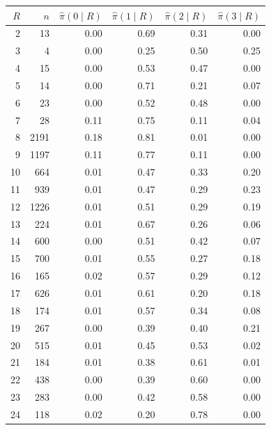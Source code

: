 \begin{tabular}{rrrrrr}
\toprule
$R$ & $n$ & $\hat\pi(0\mid R)$ & $\hat\pi(1\mid R)$ & $\hat\pi(2\mid R)$ & $\hat\pi(3\mid R)$ \\
\midrule
2 & 13 & 0.00 & 0.69 & 0.31 & 0.00 \\
3 & 4 & 0.00 & 0.25 & 0.50 & 0.25 \\
4 & 15 & 0.00 & 0.53 & 0.47 & 0.00 \\
5 & 14 & 0.00 & 0.71 & 0.21 & 0.07 \\
6 & 23 & 0.00 & 0.52 & 0.48 & 0.00 \\
7 & 28 & 0.11 & 0.75 & 0.11 & 0.04 \\
8 & 2191 & 0.18 & 0.81 & 0.01 & 0.00 \\
9 & 1197 & 0.11 & 0.77 & 0.11 & 0.00 \\
10 & 664 & 0.01 & 0.47 & 0.33 & 0.20 \\
11 & 939 & 0.01 & 0.47 & 0.29 & 0.23 \\
12 & 1226 & 0.01 & 0.51 & 0.29 & 0.19 \\
13 & 224 & 0.01 & 0.67 & 0.26 & 0.06 \\
14 & 600 & 0.00 & 0.51 & 0.42 & 0.07 \\
15 & 700 & 0.01 & 0.55 & 0.27 & 0.18 \\
16 & 165 & 0.02 & 0.57 & 0.29 & 0.12 \\
17 & 626 & 0.01 & 0.61 & 0.20 & 0.18 \\
18 & 174 & 0.01 & 0.57 & 0.34 & 0.08 \\
19 & 267 & 0.00 & 0.39 & 0.40 & 0.21 \\
20 & 515 & 0.01 & 0.45 & 0.53 & 0.02 \\
21 & 184 & 0.01 & 0.38 & 0.61 & 0.01 \\
22 & 438 & 0.00 & 0.39 & 0.60 & 0.00 \\
23 & 283 & 0.00 & 0.42 & 0.58 & 0.00 \\
24 & 118 & 0.02 & 0.20 & 0.78 & 0.00 \\
\bottomrule
\end{tabular}
